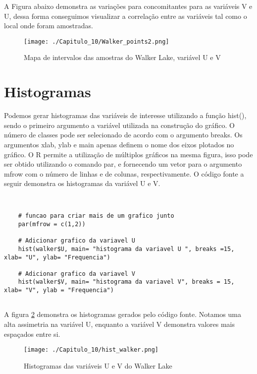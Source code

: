 A Figura abaixo demonstra as variações para concomitantes para as variáveis V e U, dessa forma conseguimos visualizar a correlação entre as variáveis tal como o local onde foram amostradas. 

\FloatBarrier
 \begin{figure}[H]
	\centering
	\texttt{[image: ./Capitulo\_10/Walker\_points2.png]}	
	\caption{Mapa de intervalos das amostras do Walker Lake, variável U e V}
	\label{walk}
\end{figure}
\FloatBarrier


\section{Histogramas} 

Podemos gerar histogramas das variáveis de interesse utilizando a função hist(), sendo o primeiro argumento a variável utilizada na construção do gráfico. O número de classes pode ser selecionado de acordo com o argumento breaks. Os argumentos xlab, ylab e main apenas definem o nome dos eixos plotados no gráfico. O R permite a utilização de múltiplos gráficos na mesma figura, isso pode ser obtido utilizando o comando par, e fornecendo um vetor para o argumento mfrow com o número de linhas e de colunas, respectivamente. O código fonte a seguir demonstra os histogramas da variável U e V. 

\begin{scriptsize}
	\estiloR
	\begin{lstlisting}[]
	
	
	# funcao para criar mais de um grafico junto 
	par(mfrow = c(1,2))
	
	# Adicionar grafico da variavel U
	hist(walker$U, main= "histograma da variavel U ", breaks =15, xlab= "U", ylab= "Frequencia")
	
	# Adicionar grafico da variavel V
	hist(walker$V, main= "histograma da variavel V", breaks = 15,  xlab= "V", ylab = "Frequencia")
	
	\end{lstlisting}
\end{scriptsize}

A figura \ref{histogramas} demonstra os histogramas gerados pelo código fonte. Notamos uma alta assimetria na variável U, enquanto a variável V demonstra valores mais espaçados entre si. 

\FloatBarrier
\begin{figure}[h]
	\centering
	\texttt{[image: ./Capitulo\_10/hist\_walker.png]}	
	\caption{Histogramas das variáveis U e V do Walker Lake}
	\label{histogramas}
\end{figure}
\FloatBarrier

